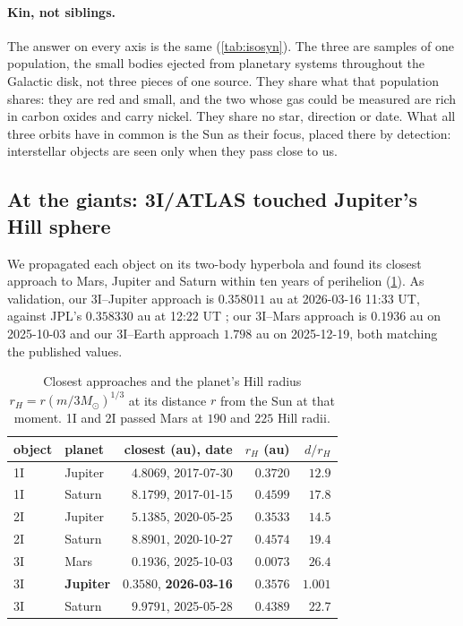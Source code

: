 \documentclass[11pt]{article}
\theoremstyle{definition}\newtheorem{definition}[theorem]{Definition}
\theoremstyle{remark}\newtheorem{remark}[theorem]{Remark}
\begin{document}
\paragraph{Kin, not siblings.} The answer on every axis is the same (\cref{tab:isosyn}). The three are samples of one population, the small bodies ejected from planetary systems throughout the Galactic disk, not three pieces of one source. They share what that population shares: they are red and small, and the two whose gas could be measured are rich in carbon oxides and carry nickel. They share no star, direction or date. What all three orbits have in common is the Sun as their focus, placed there by detection: interstellar objects are seen only when they pass close to us.

\subsection{At the giants: 3I/ATLAS touched Jupiter's Hill sphere}\label{sec:contact}
We propagated each object on its two-body hyperbola and found its closest approach to Mars, Jupiter and Saturn within ten years of perihelion (\cref{tab:isoplanets}). As validation, our 3I--Jupiter approach is $0.358011$ au at 2026-03-16 11:33 UT, against JPL's $0.358330$ au at 12:22 UT \cite{W3I}; our 3I--Mars approach is $0.1936$ au on 2025-10-03 and our 3I--Earth approach $1.798$ au on 2025-12-19, both matching the published values.

\begin{table}[!htb]\centering\small
\begin{tabular}{@{}llrrr@{}}\toprule
object & planet & closest (au), date & $r_H$ (au) & $d/r_H$\\\midrule
1I & Jupiter & $4.8069$, 2017-07-30 & $0.3720$ & $12.9$\\
1I & Saturn & $8.1799$, 2017-01-15 & $0.4599$ & $17.8$\\
2I & Jupiter & $5.1385$, 2020-05-25 & $0.3533$ & $14.5$\\
2I & Saturn & $8.8901$, 2020-10-27 & $0.4574$ & $19.4$\\
3I & Mars & $0.1936$, 2025-10-03 & $0.0073$ & $26.4$\\
3I & \textbf{Jupiter} & $\mathbf{0.3580}$, \textbf{2026-03-16} & $\mathbf{0.3576}$ & $\mathbf{1.001}$\\
3I & Saturn & $9.9791$, 2025-05-28 & $0.4389$ & $22.7$\\\bottomrule
\end{tabular}
\caption{Closest approaches and the planet's Hill radius $r_H=r(m/3M_\odot)^{1/3}$ at its distance $r$ from the Sun at that moment. 1I and 2I passed Mars at $190$ and $225$ Hill radii.}\label{tab:isoplanets}
\end{table}
\end{document}

